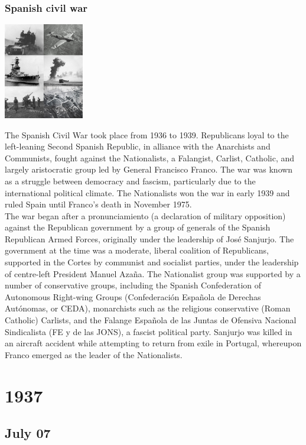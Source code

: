 \documentclass[11pt]{report}
\begin{document}
\subsection{Spanish civil war}
\vspace{2mm}\begin{center}\includegraphics[width=3.5cm]{./img/spanishCivWar.jpg}\end{center}
The Spanish Civil War took place from 1936 to 1939. Republicans loyal to the left-leaning Second Spanish Republic, in alliance with the Anarchists and Communists, fought against the Nationalists, a Falangist, Carlist, Catholic, and largely aristocratic group led by General Francisco Franco. The war was known as a struggle between democracy and fascism, particularly due to the international political climate. The Nationalists won the war in early 1939 and ruled Spain until Franco's death in November 1975.\\ \indent The war began after a pronunciamiento (a declaration of military opposition) against the Republican government by a group of generals of the Spanish Republican Armed Forces, originally under the leadership of José Sanjurjo. The government at the time was a moderate, liberal coalition of Republicans, supported in the Cortes by communist and socialist parties, under the leadership of centre-left President Manuel Azaña. The Nationalist group was supported by a number of conservative groups, including the Spanish Confederation of Autonomous Right-wing Groups (Confederación Española de Derechas Autónomas, or CEDA), monarchists such as the religious conservative (Roman Catholic) Carlists, and the Falange Española de las Juntas de Ofensiva Nacional Sindicalista (FE y de las JONS), a fascist political party. Sanjurjo was killed in an aircraft accident while attempting to return from exile in Portugal, whereupon Franco emerged as the leader of the Nationalists.

\chapter{1937}
\section{July 07}
\end{document}
